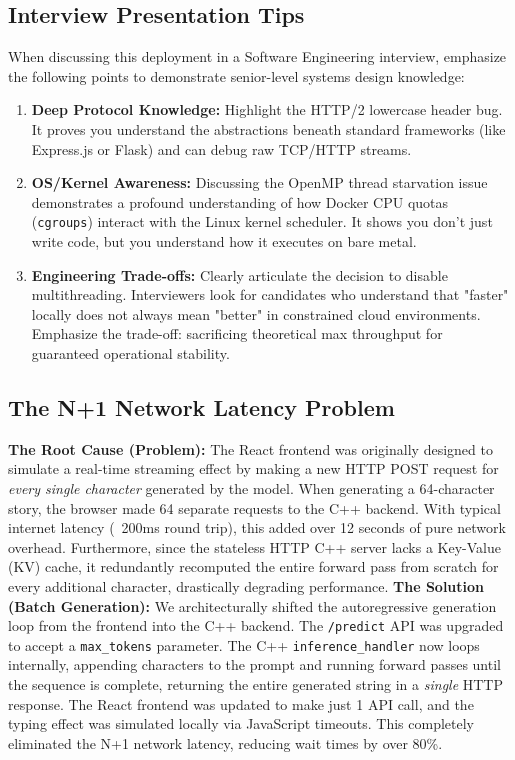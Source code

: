 \documentclass[12pt, a4paper]{article}
\begin{document}
\subsection{Interview Presentation Tips}
When discussing this deployment in a Software Engineering interview, emphasize the following points to demonstrate senior-level systems design knowledge:
\begin{enumerate}
    \item \textbf{Deep Protocol Knowledge:} Highlight the HTTP/2 lowercase header bug. It proves you understand the abstractions beneath standard frameworks (like Express.js or Flask) and can debug raw TCP/HTTP streams.
    \item \textbf{OS/Kernel Awareness:} Discussing the OpenMP thread starvation issue demonstrates a profound understanding of how Docker CPU quotas (\texttt{cgroups}) interact with the Linux kernel scheduler. It shows you don't just write code, but you understand how it executes on bare metal.
    \item \textbf{Engineering Trade-offs:} Clearly articulate the decision to disable multithreading. Interviewers look for candidates who understand that "faster" locally does not always mean "better" in constrained cloud environments. Emphasize the trade-off: sacrificing theoretical max throughput for guaranteed operational stability.
\end{enumerate}

\subsection{The N+1 Network Latency Problem}
\textbf{The Root Cause (Problem):} The React frontend was originally designed to simulate a real-time streaming effect by making a new HTTP POST request for \textit{every single character} generated by the model. When generating a 64-character story, the browser made 64 separate requests to the C++ backend. With typical internet latency (~200ms round trip), this added over 12 seconds of pure network overhead. Furthermore, since the stateless HTTP C++ server lacks a Key-Value (KV) cache, it redundantly recomputed the entire forward pass from scratch for every additional character, drastically degrading performance.
\newline\newline
\textbf{The Solution (Batch Generation):} We architecturally shifted the autoregressive generation loop from the frontend into the C++ backend. The \texttt{/predict} API was upgraded to accept a \texttt{max\_tokens} parameter. The C++ \texttt{inference\_handler} now loops internally, appending characters to the prompt and running forward passes until the sequence is complete, returning the entire generated string in a \textit{single} HTTP response. The React frontend was updated to make just 1 API call, and the typing effect was simulated locally via JavaScript timeouts. This completely eliminated the N+1 network latency, reducing wait times by over 80\%.
\end{document}
